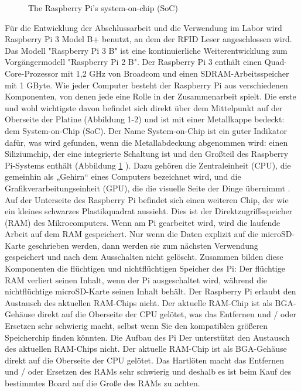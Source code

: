 \begin{figure}
	\caption{The Raspberry Pi’s system-on-chip (SoC)}
	\label{fig:rasp_soc}
\end{figure}

Für die Entwicklung der Abschlussarbeit und die Verwendung im Labor wird Raspberry Pi 3 Model B+ benutzt, an dem der RFID Leser angeschlossen wird. Das Modell "Raspberry Pi 3 B" ist eine kontinuierliche Weiterentwicklung zum Vorgängermodell "Raspberry Pi 2 B".
Der Raspberry Pi 3 enthält einen Quad-Core-Prozessor mit 1,2 GHz von Broadcom und einen SDRAM-Arbeitsspeicher mit 1 GByte. Wie jeder Computer besteht der Raspberry Pi aus verschiedenen Komponenten, von denen jede eine Rolle in der Zusammenarbeit spielt. Die erste und wohl wichtigste davon befindet sich direkt über dem Mittelpunkt auf der Oberseite der Platine (Abbildung 1-2) und ist mit einer Metallkappe bedeckt: dem System-on-Chip (SoC). Der Name System-on-Chip ist ein guter Indikator dafür, was wird gefunden, wenn die Metallabdeckung abgenommen wird: einen Siliziumchip, der eine integrierte Schaltung ist und den Großteil des Raspberry Pi-Systems enthält (Abbildung \ref{fig:rasp_soc} \cite[p. 10]{gareth:raspi}). Dazu gehören die Zentraleinheit (CPU), die gemeinhin als „Gehirn“ eines Computers bezeichnet wird, und die Grafikverarbeitungseinheit (GPU), die die visuelle Seite der Dinge übernimmt \cite[p. 11]{gareth:raspi}. Auf der Unterseite des Raspberry Pi befindet sich einen weiteren Chip, der wie ein kleines schwarzes Plastikquadrat aussieht. Dies ist der Direktzugriffsspeicher (RAM) des Mikrocomputers. Wenn am Pi gearbeitet wird, wird die laufende Arbeit auf dem RAM gespeichert. Nur wenn die Daten explizit auf die microSD-Karte geschrieben werden, dann werden sie zum nächsten Verwendung gespeichert und nach dem Ausschalten nicht gelöscht. Zusammen bilden diese Komponenten die flüchtigen und nichtflüchtigen Speicher des Pi: Der flüchtige RAM verliert seinen Inhalt, wenn der Pi ausgeschaltet wird, während die nichtflüchtige microSD-Karte seinen Inhalt behält. Der Raspberry Pi  erlaubt den Austausch des aktuellen RAM-Chips nicht. Der aktuelle RAM-Chip ist als BGA-Gehäuse direkt auf die Oberseite der CPU gelötet, was das Entfernen und / oder Ersetzen sehr schwierig macht, selbst wenn Sie den kompatiblen größeren Speicherchip finden könnten. Die Aufbau des Pi Der unterstützt den Austausch des aktuellen RAM-Chips nicht. Der aktuelle RAM-Chip ist als BGA-Gehäuse direkt auf die Oberseite der CPU gelötet. Das Hartlöten macht das Entfernen und / oder Ersetzen des RAMs sehr schwierig und deshalb es ist beim Kauf des bestimmtes Board auf die Große des RAMs zu achten.

